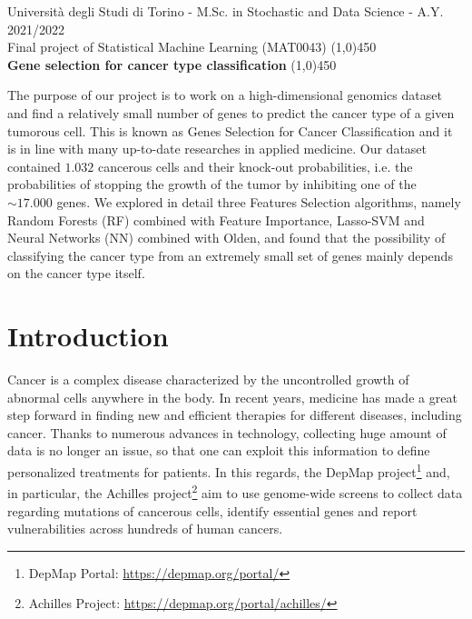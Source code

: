 \documentclass[a4paper,11pt, oneside]{article}  %
\begin{document}
\setcounter{secnumdepth}{2}
\pagestyle{plain} %

\begin{center}
	Università degli Studi di Torino - M.Sc.  in Stochastic and Data Science - A.Y.  2021/2022 \\
	\Large { Final project of Statistical Machine Learning (MAT0043)}
	\line(1,0){450}\\ 
	\vspace{0.4cm} 
	{ \huge \textbf{Gene selection for cancer type classification} }
	\vspace{0.1cm}
	\line(1,0){450} \\
\end{center}


The purpose of our project is to work on a high-dimensional genomics dataset and find a relatively small number of genes to predict the cancer type of a given tumorous cell. This is known as Genes Selection for Cancer Classification and it is in line with many up-to-date researches in applied medicine.  Our dataset contained $1.032$ cancerous cells and their knock-out probabilities, i.e.  the probabilities of stopping the growth of the tumor by inhibiting one of the $\sim 17.000$ genes.  We explored in detail three Features Selection algorithms,  namely Random Forests (RF) combined with Feature Importance,  Lasso-SVM and Neural Networks (NN) combined with Olden,  and found that the possibility of classifying the cancer type from an extremely small set of genes mainly depends on the cancer type itself.  


\section{Introduction}
Cancer is a complex disease characterized by the uncontrolled growth of abnormal cells anywhere in the body.  In recent years,  medicine has made a great step forward in finding new and efficient therapies for different diseases,  including cancer.  Thanks to numerous advances in technology,  collecting huge amount of data is no longer an issue,  so that one can exploit this information to define personalized treatments for patients.  In this regards,  the DepMap project\footnote{DepMap Portal: \url{https://depmap.org/portal/} } and,  in particular,  the Achilles project\footnote{Achilles Project: \url{https://depmap.org/portal/achilles/} } aim to use genome-wide screens to collect data regarding mutations of cancerous cells,  identify essential genes and report vulnerabilities across hundreds of human cancers. 
\end{document}
